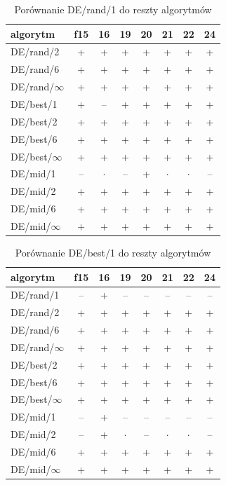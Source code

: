 \documentclass[a4paper,onecolumn,oneside,11pt,wide,floatssmall]{mwrep}
\theoremstyle{definition}
\theoremstyle{plain}%
\theoremstyle{remark}
\begin{document}
\begin{table}[H]
\centering
\begin{tabular}{ l | c | c | c | c | c | c | c }
algorytm         &f15& 16& 19& 20& 21& 22& 24 \\ \hline
DE/rand/2	 & + & + & + & + & + & + & + \\
DE/rand/6	 & + & + & + & + & + & + & + \\
DE/rand/$\infty$	 & + & + & + & + & + & + & + \\
DE/best/1	 & + & -- & + & + & + & + & + \\
DE/best/2	 & + & + & + & + & + & + & + \\
DE/best/6	 & + & + & + & + & + & + & + \\
DE/best/$\infty$	 & + & + & + & + & + & + & + \\
DE/mid/1	 & -- & $\cdot$ & -- & + & $\cdot$ & $\cdot$ & -- \\
DE/mid/2	 & + & + & + & + & + & + & + \\
DE/mid/6	 & + & + & + & + & + & + & + \\
DE/mid/$\infty$	 & + & + & + & + & + & + & + \\
\end{tabular}
\caption{Porównanie DE/rand/1 do reszty algorytmów}
\end{table}

\begin{table}[H]
\centering
\begin{tabular}{ l | c | c | c | c | c | c | c }
algorytm         &f15& 16& 19& 20& 21& 22& 24 \\ \hline
DE/rand/1	 & -- & + & -- & -- & -- & -- & -- \\
DE/rand/2	 & + & + & + & + & + & + & + \\
DE/rand/6	 & + & + & + & + & + & + & + \\
DE/rand/$\infty$	 & + & + & + & + & + & + & + \\
DE/best/2	 & + & + & + & + & + & + & + \\
DE/best/6	 & + & + & + & + & + & + & + \\
DE/best/$\infty$	 & + & + & + & + & + & + & + \\
DE/mid/1	 & -- & + & -- & -- & -- & -- & -- \\
DE/mid/2	 & -- & + & $\cdot$ & -- & $\cdot$ & $\cdot$ & -- \\
DE/mid/6	 & + & + & + & + & + & + & + \\
DE/mid/$\infty$	 & + & + & + & + & + & + & + \\
\end{tabular}
\caption{Porównanie DE/best/1 do reszty algorytmów}
\end{table}
\end{document}
